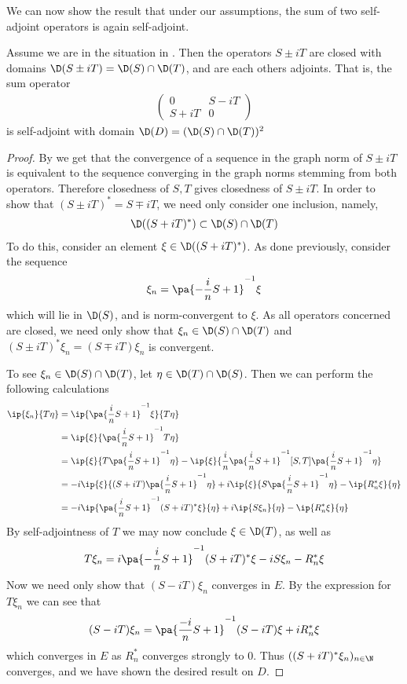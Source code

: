 We can now show the result that under our assumptions, the sum of two self-adjoint operators is again self-adjoint.
\begin{theorem}\label{sumselfadjoint}
	Assume we are in the situation in . Then the operators $S\pm iT$ are closed with domains $\D(S\pm iT)=\D(S)\cap \D(T)$, and are each others adjoints. That is, the sum operator 
	\begin{align*}
		\begin{pmatrix}
			0 & S-iT \\
			S+iT & 0
		\end{pmatrix}
	\end{align*}
	is self-adjoint with domain $\D(D)=(\D(S)\cap \D(T))^2$
\end{theorem}
\begin{proof}
	By  we get that the convergence of a sequence in the graph norm of $S\pm iT$ is equivalent to the sequence converging in the graph norms stemming from both operators. Therefore closedness of $S,T$ gives closedness of $S\pm iT$. In order to show that $(S\pm iT)^*=S\mp iT$, we need only consider one inclusion, namely,
	\begin{align*}
		\D((S+iT)^*)\subset \D(S)\cap \D(T)
	\end{align*}
	To do this, consider an element $\xi \in \D((S+iT)^*)$. As done previously, consider the sequence
	\begin{align*}
		\xi_n=\pa{-\frac{i}{n}S+1}^{-1}\xi
	\end{align*}
	which will lie in $\D(S)$, and is norm-convergent to $\xi$. As all operators concerned are closed, we need only show that $\xi_n \in \D(S)\cap \D(T)$ and $(S\pm iT)^*\xi_n=(S\mp iT)\xi_n$ is convergent.
	
	To see $\xi_n\in \D(S)\cap \D(T)$, let $\eta\in \D(T)\cap \D(S)$. Then we can perform the following calculations
	\begin{align*}
		\ip{\xi_n}{T\eta}&=\ip{\pa{\frac{i}{n}S+1}^{-1}\xi}{T\eta} \\
		&=\ip{\xi}{\pa{\frac{i}{n}S+1}^{-1}T\eta} \\
		&=\ip{\xi}{T\pa{\frac{i}{n}S+1}^{-1}\eta}-\ip{\xi}{\frac{i}{n}\pa{\frac{i}{n}S+1}^{-1}[S,T]\pa{\frac{i}{n}S+1}^{-1}\eta} \\ 
		&=-i\ip{\xi}{(S+iT)\pa{\frac{i}{n}S+1}^{-1}\eta}+i\ip{\xi}{S\pa{\frac{i}{n}S+1}^{-1}\eta}-\ip{R_n^*\xi}{\eta} \\
		&=-i\ip{\pa{\frac{i}{n}S+1}^{-1}(S+iT)^*\xi}{\eta}+i\ip{S\xi_n}{\eta}-\ip{R_n^*\xi}{\eta}
	\end{align*}
	By self-adjointness of $T$ we may now conclude $\xi\in \D(T)$, as well as 
	\begin{align*}
		T\xi_n=i\pa{-\frac{i}{n}S+1}^{-1}(S+iT)^*\xi-iS\xi_n-R_n^*\xi
	\end{align*}
	Now we need only show that $(S-iT)\xi_n$ converges in $E$. By the expression for $T\xi_n$ we can see that
	\begin{align*}
		(S-iT)\xi_n=\pa{\frac{-i}{n}S+1}^{-1}(S-iT)\xi+iR_n^*\xi
	\end{align*}
	which converges in $E$ as $R_n^*$ converges strongly to 0. Thus $((S+iT)^*\xi_n)_{n\in \N}$ converges, and we have shown the desired result on $D$. 
\end{proof}

